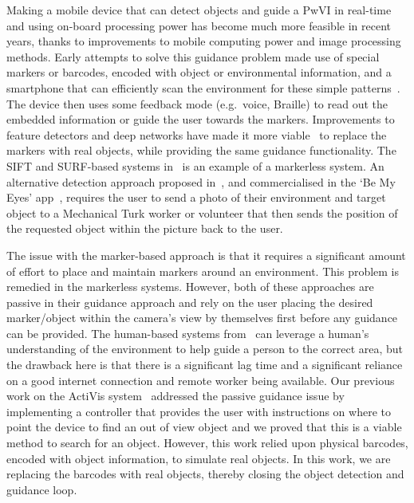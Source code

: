 \documentclass[runningheads]{llncs}
\begin{document}
Making a mobile device that can detect objects and guide a PwVI in real-time and using on-board processing power has become much more feasible in recent years, thanks to improvements to mobile computing power and image processing methods.
Early attempts to solve this guidance problem made use of special markers or barcodes, encoded with object or environmental information, and a smartphone that can efficiently scan the environment for these simple patterns~\cite{gude2013blind,iannizzotto2005badge3d,manduchi2012mobile}. 
The device then uses some feedback mode (e.g.\ voice, Braille) to read out the embedded information or guide the user towards the markers. 
Improvements to feature detectors and deep networks have made it more viable~\cite{redmon2016you,huang2017speed} to replace the markers with real objects, while providing the same guidance functionality.
The SIFT and SURF-based systems in~\cite{schauerte2012assistive} is an example of a markerless system.
An alternative detection approach proposed in~\cite{bigham2010vizwiz}, and commercialised in the `Be My Eyes' app~\cite{bemyeyes2019}, requires the user to send a photo of their environment and target object to a Mechanical Turk worker or volunteer that then sends the position of the requested object within the picture back to the user. 

The issue with the marker-based approach is that it requires a significant amount of effort to place and maintain markers around an environment.
This problem is remedied in the markerless systems.
However, both of these approaches are passive in their guidance approach and rely on the user placing the desired marker/object within the camera's view by themselves first before any guidance can be provided. 
The human-based systems from~\cite{bigham2010vizwiz,bemyeyes2019} can leverage a human's understanding of the environment to help guide a person to the correct area, but the drawback here is that there is a significant lag time and a significant reliance on a good internet connection and remote worker being available. 
Our previous work on the ActiVis system~\cite{lock2019active} addressed the passive guidance issue by implementing a controller that provides the user with instructions on where to point the device to find an out of view object and we proved that this is a viable method to search for an object. 
However, this work relied upon physical barcodes, encoded with object information, to simulate real objects.
In this work, we are replacing the barcodes with real objects, thereby closing the object detection and guidance loop. 
\end{document}
